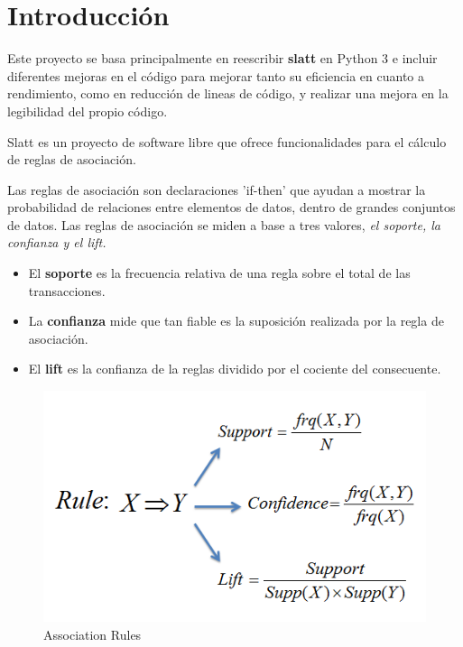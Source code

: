 \documentclass{cosas/tfg_domingo}
\begin{document}

\portada
\frontmatter
\resumen{}{}
\tableofcontents

\mainmatter
\chapter{Introducción}

Este proyecto se basa principalmente en reescribir \textbf{slatt} en Python 3 e incluir diferentes mejoras en el código para mejorar tanto su eficiencia en cuanto a rendimiento, como en reducción de lineas de código, y realizar una mejora en la legibilidad del propio código.

Slatt es un proyecto de software libre que ofrece funcionalidades para el cálculo de reglas de asociación. 

Las reglas de asociación son declaraciones 'if-then' que ayudan a mostrar la probabilidad de relaciones entre elementos de datos, dentro de grandes conjuntos de datos. Las reglas de asociación se miden a base a tres valores, \textit{el soporte, la confianza y el lift.}

\begin{itemize}
    \item El \textbf{soporte} es la frecuencia relativa de una regla sobre el total de las transacciones.
    \item La \textbf{confianza} mide que tan fiable es la suposición realizada por la regla de asociación.
    \item El \textbf{lift} es la confianza de la reglas dividido por el cociente del consecuente.
\end{itemize}


\begin{figure}[ht!] %
\begin{center}
\includegraphics[width=.6\linewidth]{imagenes/AR_1.png}
\end{center}
\caption{Association Rules}
\label{fig_pro}
\end{figure}
\end{document}

